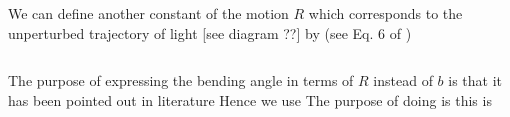 We can define another constant of the motion $R$ which corresponds to the unperturbed trajectory of light [see diagram ??] by (see Eq. 6 of \citet{ishak2008new})

\begin{equation}
  
  \label{eq:r0-R-relation}
\end{equation}

The purpose of expressing the bending angle in terms of $R$ instead of $b$ is that it has been pointed out in literature 
Hence we use 
The purpose of doing is this is 